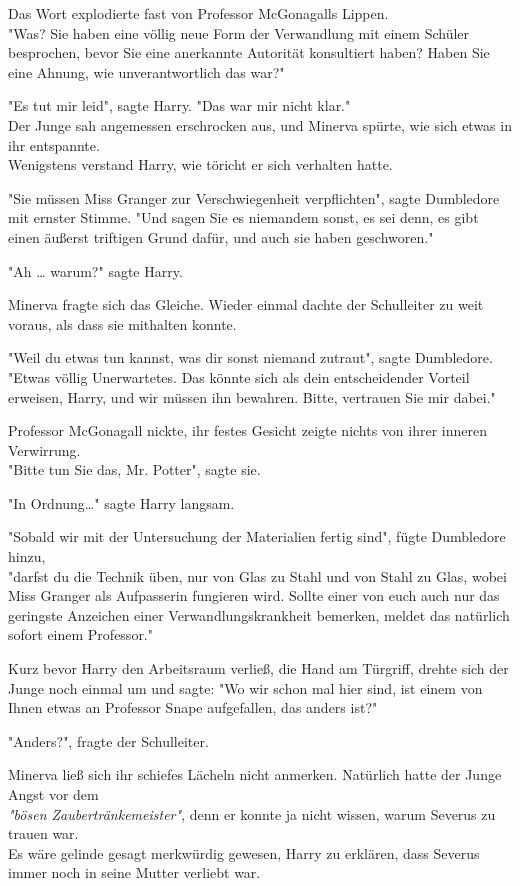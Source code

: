 {Das Wort explodierte fast von Professor McGonagalls Lippen.\\ "Was? Sie haben eine völlig neue Form der Verwandlung mit einem Schüler besprochen, bevor Sie eine anerkannte Autorität konsultiert haben? Haben Sie eine Ahnung, wie unverantwortlich das war?"

"Es tut mir leid", sagte Harry. "Das war mir nicht klar."\\ Der Junge sah angemessen erschrocken aus, und Minerva spürte, wie sich etwas in ihr entspannte.\\ Wenigstens verstand Harry, wie töricht er sich verhalten hatte.

"Sie müssen Miss Granger zur Verschwiegenheit verpflichten", sagte Dumbledore mit ernster Stimme. "Und sagen Sie es niemandem sonst, es sei denn, es gibt einen äußerst triftigen Grund dafür, und auch sie haben geschworen."

"Ah … warum?" sagte Harry.

Minerva fragte sich das Gleiche. Wieder einmal dachte der Schulleiter zu weit voraus, als dass sie mithalten konnte.

"Weil du etwas tun kannst, was dir sonst niemand zutraut", sagte Dumbledore.\\ "Etwas völlig Unerwartetes. Das könnte sich als dein entscheidender Vorteil erweisen, Harry, und wir müssen ihn bewahren. Bitte, vertrauen Sie mir dabei."

Professor McGonagall nickte, ihr festes Gesicht zeigte nichts von ihrer inneren Verwirrung.\\ "Bitte tun Sie das, Mr. Potter", sagte sie.

"In Ordnung…" sagte Harry langsam.

"Sobald wir mit der Untersuchung der Materialien fertig sind", fügte Dumbledore hinzu,\\ "darfst du die Technik üben, nur von Glas zu Stahl und von Stahl zu Glas, wobei Miss Granger als Aufpasserin fungieren wird. Sollte einer von euch auch nur das geringste Anzeichen einer Verwandlungskrankheit bemerken, meldet das natürlich sofort einem Professor."

Kurz bevor Harry den Arbeitsraum verließ, die Hand am Türgriff, drehte sich der Junge noch einmal um und sagte: "Wo wir schon mal hier sind, ist einem von Ihnen etwas an Professor Snape aufgefallen, das anders ist?"

"Anders?", fragte der Schulleiter.

Minerva ließ sich ihr schiefes Lächeln nicht anmerken. Natürlich hatte der Junge Angst vor dem\\ \emph{"bösen Zaubertränkemeister"}, denn er konnte ja nicht wissen, warum Severus zu trauen war.\\ Es wäre gelinde gesagt merkwürdig gewesen, Harry zu erklären, dass Severus immer noch in seine Mutter verliebt war.

}
